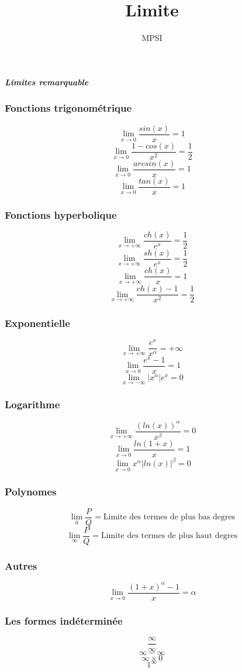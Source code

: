 \documentclass[a4paper,12pt,twocolumn]{report}
\title{Limite}
\author{MPSI}
\begin{document}
\begin{center}
\begin{Large}\textbf{ \textit{Limites remarquable}}
\end{Large}
\end{center}

\subsubsection{Fonctions trigonométrique}
$$\lim_{x \to 0} \dfrac{sin(x)}{x}=1$$
$$\lim_{x \to 0} \dfrac{1 - cos(x)}{x^2}=\dfrac{1}{2}$$
$$\lim_{x \to 0} \dfrac{arcsin(x)}{x}=1$$
$$\lim_{x \to 0} \dfrac{tan(x)}{x}=1$$
\subsubsection{Fonctions hyperbolique}
$$\lim_{x \to +\infty} \dfrac{ch(x)}{e^x}=\dfrac{1}{2}$$
$$\lim_{x \to +\infty} \dfrac{sh(x)}{e^x}=\dfrac{1}{2}$$
$$\lim_{x \to +\infty} \dfrac{ch(x)}{x}=1$$
$$\lim_{x \to +\infty} \dfrac{ch(x)-1}{x^2}=\dfrac{1}{2}$$
\subsubsection{Exponentielle}
$$\lim_{x \to +\infty} \dfrac{e^x}{x^{\alpha}}=+\infty$$
$$\lim_{x \to 0} \dfrac{e^x-1}{x}=1$$
$$\lim_{x \to -\infty} |x^{\alpha}|e^x=0$$
\subsubsection{Logarithme}
$$\lim_{x \to +\infty} \dfrac{(ln(x))^{\alpha}}{x^{\beta}}=0$$
$$\lim_{x \to 0} \dfrac{ln(1+x)}{x}=1$$
$$\lim_{x \to 0} x^{\alpha}|ln(x)|^{\beta}=0$$
\subsubsection{Polynomes}
$$\lim_{0} \dfrac{P}{Q}=\mbox{Limite des termes de plus bas degres}$$
$$\lim_{\infty} \dfrac{P}{Q}=\mbox{Limite des termes de plus haut degres}$$
\subsubsection{Autres}
$$\lim_{x \to 0} \dfrac{(1+x)^{\alpha}-1}{x}=\alpha$$
\subsubsection{Les formes indéterminée}
$$\dfrac{\infty}{\infty}$$
$$\infty-\infty$$
$$\infty \times0$$
$$1^{\infty}$$
\end{document}
